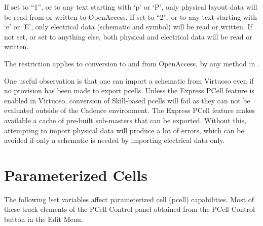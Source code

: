 \begin{description}
If set to ``1'', or to any text starting with `p' or `P', only
physical layout data will be read from or written to OpenAccess.  If
set to ``2'', or to any text starting with `e' or `E', only electrical
data (schematic and symbol) will be read or written.  If not set, or
set to anything else, both physical and electrical data will be read
or written.

The restriction applies to conversion to and from OpenAccess, by any
method in {\Xic}.

One useful observation is that one can import a schematic from
Virtuoso even if no provision has been made to export pcells.  Unless
the Express PCell feature is enabled in Virtuoso, conversion of
Skill-based pcells will fail as they can not be evaluated outside of
the Cadence environment.  The Express PCell feature makes available a
cache of pre-built sub-masters that can be exported.  Without this,
attempting to import physical data will produce a lot of errors, which
can be avoided if only a schematic is needed by importing electrical
data only.
\end{description}

\section{Parameterized Cells}

The following {\cb !set} variables affect parameterized cell (pcell)
capabilities.  Most of these track elements of the {\cb PCell Control}
panel obtained from the {\cb PCell Control} button in the {\cb Edit
Menu}.

